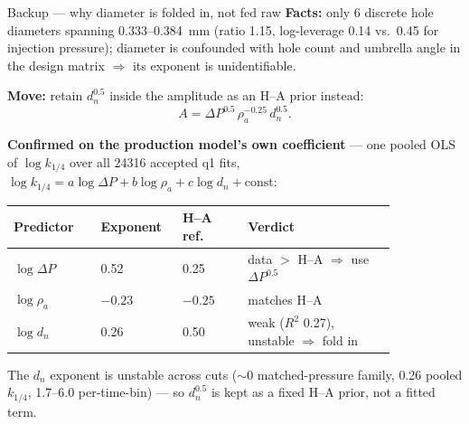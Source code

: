 \documentclass[aspectratio=169,11pt]{beamer}
\newcommand{\good}[1]{\textcolor{goodGreen}{#1}}
\newcommand{\warn}[1]{\textcolor{warnRed}{#1}}
\begin{document}
\begin{frame}{Backup --- why diameter is folded in, not fed raw}
\small
\textbf{Facts:} only 6 discrete hole diameters spanning \num{0.333}--\SI{0.384}{mm} (ratio 1.15, log-leverage 0.14 vs.\ 0.45 for injection pressure); diameter is confounded with hole count and umbrella angle in the design matrix $\Rightarrow$ its exponent is unidentifiable.

\textbf{Move:} retain $d_n^{0.5}$ inside the amplitude as an H--A prior instead:
\[
A=\Delta P^{0.5}\,\rho_a^{-0.25}\,d_n^{0.5}.
\]

\vspace{0.3em}
\footnotesize
\textbf{Confirmed on the production model's own coefficient} --- one pooled OLS of $\log k_{1/4}$ over all \num{24316} accepted q1 fits, $\log k_{1/4}=a\log\Delta P+b\log\rho_a+c\log d_n+\text{const}$:
\renewcommand{\arraystretch}{1.05}
\begin{center}
\begin{tabular}{C{0.20\linewidth}C{0.15\linewidth}C{0.15\linewidth}C{0.34\linewidth}}
\toprule
Predictor & Exponent & H--A ref. & Verdict \\
\midrule
$\log\Delta P$ & \good{0.52} & 0.25 & data $>$ H--A $\Rightarrow$ use $\Delta P^{0.5}$ \\
$\log\rho_a$   & \good{$-0.23$} & $-0.25$ & matches H--A \\
$\log d_n$     & \warn{0.26} & 0.50 & weak ($R^2$ 0.27), unstable $\Rightarrow$ fold in \\
\bottomrule
\end{tabular}
\end{center}
\smallskip
The $d_n$ exponent is unstable across cuts (\warn{$\sim$0} matched-pressure family, \warn{0.26} pooled $k_{1/4}$, \warn{1.7--6.0} per-time-bin) --- so $d_n^{0.5}$ is kept as a fixed H--A prior, not a fitted term.
\end{frame}
\end{document}
